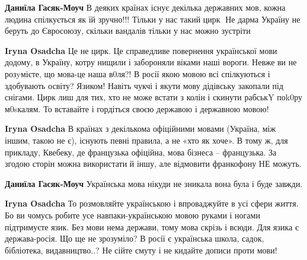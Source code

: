 \begin{itemize}
\begin{itemize}
\textbf{Даниїла Гасяк-Моуч} В деяких країнах існує декілька державних мов, кожна людина спілкується як їй зручно!!! Тільки у нас такий цирк🙉 Не дарма Україну не беруть до Євросоюзу, скільки вандалів тільки у нас можно зустріти

 
\textbf{Iryna Osadcha} Це не цирк. Це справедливе повернення української мови додому, в Україну, котру нищили і забороняли віками наші вороги. Невже ви не розyмієте, що мова-це наша в0ля?! В росії якою мовою всі спілкуються і здобувають освіту? Язиком! Навіть чукчі і якути мову дідівську закопали під снігами. Цирк лиш для тих, хто не може встати з колін і скинути рабськY поk0ру м0sкалям. То вставайте і гордіться своєю державою і державною мовою!

 
\textbf{Iryna Osadcha} В країнах з декількома офіційними мовами (Україна, між іншим, такою не є), існують певні правила, а не «хто як хоче». В тому ж, для прикладу, Квебеку, де французька офіційна, мова бізнеса – французька. За згодою сторін можна використати й іншу, але відмовити франкофону НЕ можуть.

 
\textbf{Даниїла Гасяк-Моуч} Українська мова нікуди не зникала вона була і буде завжди.

 
\textbf{Iryna Osadcha} То розмовляйте українською і впроваджуйте в усі сфери життя. Бо ви чомусь робите усе навпаки-українською мовою руками і ногами підтримуєте язик. Без мови нема держави, тому мова скрізь і всюди. Для язика є держава-росія. Що ще не зрозуміло? В росії є українська школа, садок, бібліотека, видавництво..? Не сійте смуту і не кидайте дописи проти мови!


\end{itemize}
\end{itemize}
